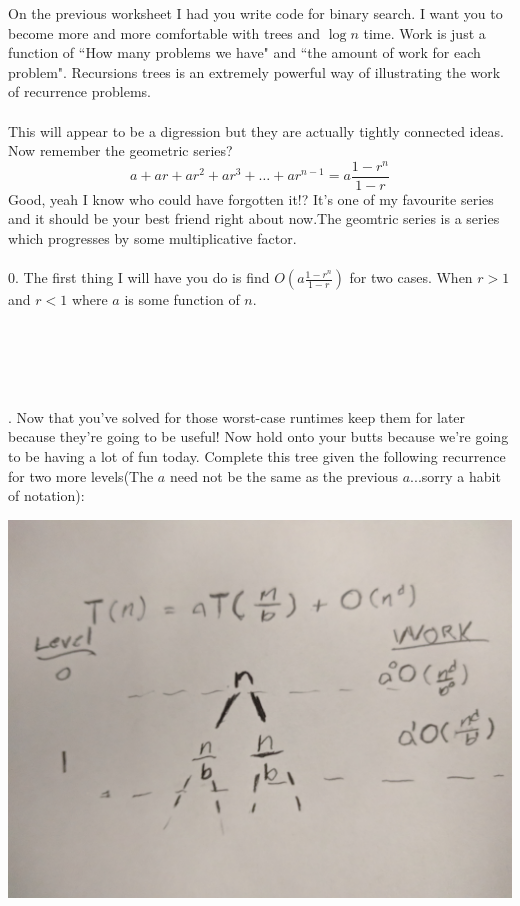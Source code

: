 \documentclass[12pt]{article}
\begin{document}
\newpage
\noindent On the previous worksheet I had you write code for binary search. I want you to become more and more comfortable with trees and $\log{n}$ time. Work is just a function of ``How many problems we have" and ``the amount of work for each problem". Recursions trees is an extremely powerful way of illustrating the work of recurrence problems.\\\\
This will appear to be a digression but they are actually tightly connected ideas. Now remember the geometric series?
$$a + ar + ar^2+ar^3+\dots + ar^{n-1} = a\frac{1-r^n}{1-r}$$
Good, yeah I know who could have forgotten it!? It's one of my favourite series and it should be your best friend right about now.The geomtric series is a series which progresses by some multiplicative factor. \\\\
0. The first thing I will have you do is find $O(a\frac{1-r^n}{1-r})$ for two cases. When $r>1$ and $r<1$ where $a$ is some function of $n$.\\\\\\\\\\\\
\newpage
{}. Now that you've solved for those worst-case runtimes keep them for later because they're going to be useful! Now hold onto your butts because we're going to be having a lot of fun today. Complete this tree given the following recurrence for two more levels(The $a$ need not be the same as the previous $a$...sorry a habit of notation):\\
\centerline{\includegraphics[scale = 0.05]{tree.jpg}} 
\end{document}
